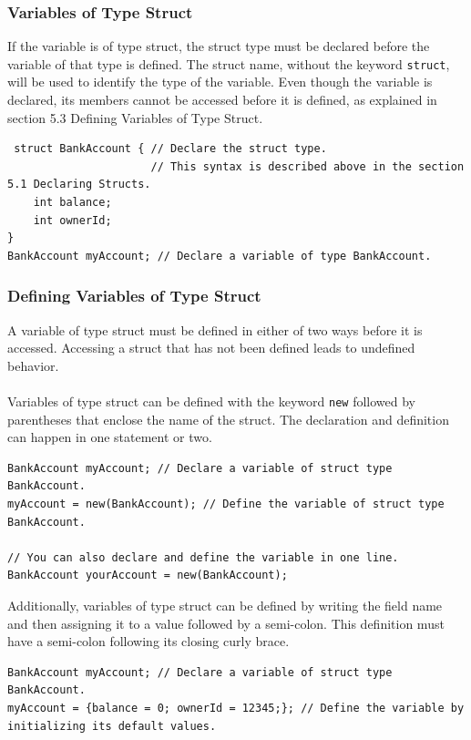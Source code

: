 \documentclass[12pt]{article}
\begin{document}
\subsubsection{Variables of Type Struct}
 If the variable is of type struct, the struct type must be declared before the variable of that type is defined. The struct name, without the keyword \lstinline!struct!, will be used to identify the type of the variable. Even though the variable is declared, its members cannot be accessed before it is defined, as explained in section 5.3 Defining Variables of Type Struct. \\
 \begin{lstlisting}
 struct BankAccount { // Declare the struct type.
                      // This syntax is described above in the section 5.1 Declaring Structs.
    int balance;
    int ownerId;
}
BankAccount myAccount; // Declare a variable of type BankAccount.
\end{lstlisting}

\subsubsection{Defining Variables of Type Struct}
A variable of type struct must be defined in either of two ways before it is accessed. Accessing a struct that has not been defined leads to undefined behavior.\\
\\
Variables of type struct can be defined with the keyword \lstinline!new! followed by parentheses that enclose the name of the struct. The declaration and definition can happen in one statement or two. 
\begin{lstlisting}
BankAccount myAccount; // Declare a variable of struct type BankAccount.
myAccount = new(BankAccount); // Define the variable of struct type BankAccount.

// You can also declare and define the variable in one line.
BankAccount yourAccount = new(BankAccount);
\end{lstlisting}

Additionally, variables of type struct can be defined by writing the field name and then assigning it to a value followed by a semi-colon. This definition must have a semi-colon following its closing curly brace.
\begin{lstlisting}
BankAccount myAccount; // Declare a variable of struct type BankAccount.
myAccount = {balance = 0; ownerId = 12345;}; // Define the variable by initializing its default values.
\end{lstlisting}
\end{document}
